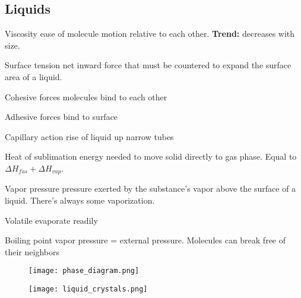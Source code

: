 \begin{mdframed}
\subsection{Liquids}
\begin{compactdesc}
\item[]
\item[Viscosity] ease of molecule motion relative to each other.
    \textbf{Trend:} decreases with size.
\item[Surface tension] net inward force that must be countered to expand the surface
    area of a liquid.
\item[Cohesive forces] molecules bind to each other
\item[Adhesive forces] bind to surface
\item[Capillary action] rise of liquid up narrow tubes
\item[Heat of sublimation] energy needed to move solid directly to gas phase.
    Equal to $\Delta H_{fus} + \Delta H_{vap}$.
\item[Vapor pressure] pressure exerted by the substance's vapor above the
    surface of a liquid. There's always some vaporization.
\item[Volatile] evaporate readily
\item[Boiling point] vapor pressure = external pressure. Molecules can break
    free of their neighbors
\end{compactdesc}

\begin{figure}[H]
\centering
\texttt{[image: phase\_diagram.png]}
\end{figure}

\begin{figure}[H]
\centering
\texttt{[image: liquid\_crystals.png]}
\end{figure}


\end{mdframed}


